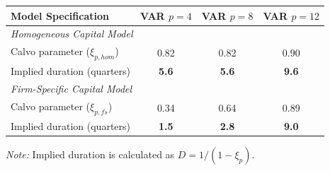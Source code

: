\centering
\footnotesize

\begin{table}[htpb]
    \centering
    \renewcommand{\arraystretch}{1.1}
    \begin{tabular}{lccc}
        \toprule
        \textbf{Model Specification} & \textbf{VAR $p=4$} & \textbf{VAR $p=8$} & \textbf{VAR $p=12$} \\
        \midrule

        \multicolumn{4}{l}{\textit{Homogeneous Capital Model}} \\
        Calvo parameter ($\xi_{p, hom}$) & 0.82 & 0.82 & \textcolor{PadovaRed}{0.90} \\
        Implied duration (quarters)      & \textbf{5.6} & \textbf{5.6} & \textcolor{PadovaRed}{\textbf{9.6}} \\

        \midrule
        \multicolumn{4}{l}{\textit{Firm-Specific Capital Model}} \\
        Calvo parameter ($\xi_{p, fs}$) & 0.34 & 0.64 & \textcolor{PadovaRed}{0.89} \\
        Implied duration (quarters)     & \textbf{1.5} & \textbf{2.8} & \textcolor{PadovaRed}{\textbf{9.0}} \\

        \bottomrule
    \end{tabular}
\end{table}

\vspace{0.2cm}
\raggedright
\tiny{\textit{Note:} Implied duration is calculated as $D = 1/(1 - \xi_p)$.}
